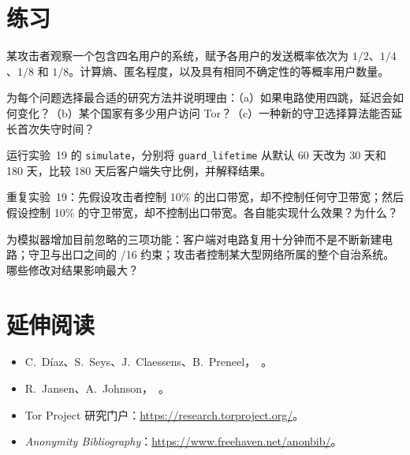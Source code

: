 \section*{练习}

\begin{esercizio}[1]\label{es:29-entropia}
某攻击者观察一个包含四名用户的系统，赋予各用户的发送概率依次为 $1/2$、$1/4$、$1/8$ 和 $1/8$。计算熵、匿名程度，以及具有相同不确定性的等概率用户数量。
\end{esercizio}

\begin{esercizio}[1]\label{es:29-metodo}
为每个问题选择最合适的研究方法并说明理由：（a）如果电路使用四跳，延迟会如何变化？（b）某个国家有多少用户访问 Tor？（c）一种新的守卫选择算法能否延长首次失守时间？
\end{esercizio}

\begin{esercizio}[2]\label{es:29-durata}
运行实验~19 的 \texttt{simulate}，分别将 \texttt{guard\_lifetime} 从默认 60 天改为 30 天和 180 天，比较 180 天后客户端失守比例，并解释结果。
\end{esercizio}

\begin{esercizio}[2]\label{es:29-asimmetria}
重复实验~19：先假设攻击者控制 10\% 的出口带宽，却不控制任何守卫带宽；然后假设控制 10\% 的守卫带宽，却不控制出口带宽。各自能实现什么效果？为什么？
\end{esercizio}

\begin{esercizio}[3]\label{es:29-torps}
为模拟器增加目前忽略的三项功能：客户端对电路复用十分钟而不是不断新建电路；守卫与出口之间的 /16 约束；攻击者控制某大型网络所属的整个自治系统。哪些修改对结果影响最大？
\end{esercizio}

\section*{延伸阅读}
\begin{itemize}
  \item C.~Díaz、S.~Seys、J.~Claessens、B.~Preneel，~\cite{diaz2002measuring}。
  \item R.~Jansen、A.~Johnson，~\cite{jansen2016privcount}。
  \item Tor Project 研究门户：\url{https://research.torproject.org/}。
  \item \emph{Anonymity Bibliography}：\url{https://www.freehaven.net/anonbib/}。
\end{itemize}
